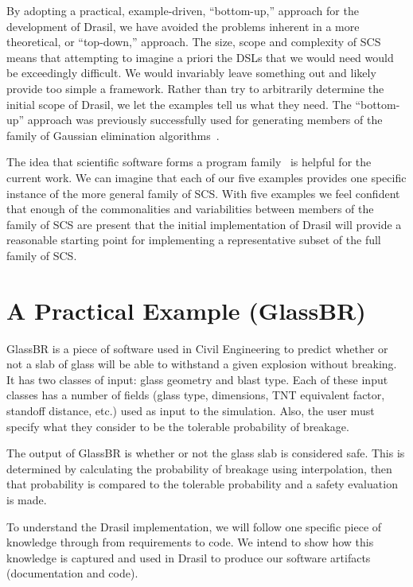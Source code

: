 \documentclass[sigconf]{acmart}
\begin{document}
By adopting a practical, example-driven, ``bottom-up,'' approach for the
development of Drasil, we have avoided the problems inherent in a more
theoretical, or ``top-down,'' approach.  The size, scope and complexity of SCS
means that attempting to imagine a priori the DSLs that we would need would be
exceedingly difficult.  We would invariably leave something out and likely
provide too simple a framework.  Rather than try to arbitrarily determine the
initial scope of Drasil, we let the examples tell us what they need. The
``bottom-up'' approach was previously successfully used for generating members
of the family of Gaussian elimination algorithms~\cite{Carette2006}.  

The idea that scientific software forms a program
family~\cite{SmithMcCutchanAndCao2007} is helpful for the current work.  We can
imagine that each of our five examples provides one specific instance of the
more general family of SCS.  With five examples we feel confident that enough of
the commonalities and variabilities between members of the family of SCS are
present that the initial implementation of Drasil will provide a reasonable
starting point for implementing a representative subset of the full family of
SCS.

\section{A Practical Example (GlassBR)} \label{SecGlassBR}

GlassBR is a piece of software used in Civil Engineering to predict whether or 
not a slab of glass will be able to withstand a given explosion without breaking. It
has two classes of input: glass geometry and blast type. Each of these input 
classes has a number of fields (glass type, dimensions, TNT equivalent factor, 
standoff distance, etc.) used as input to the simulation. Also, the user must 
specify what they consider to be the tolerable probability of breakage.

The output of GlassBR is whether or not the glass slab is considered safe. 
This is determined by calculating the probability of breakage using 
interpolation, then that probability is compared to the tolerable probability 
and a safety evaluation is made.

To understand the Drasil implementation, we will follow one specific piece of 
knowledge through from requirements to code. We intend to show how this 
knowledge is captured and used in Drasil to produce our software artifacts 
(documentation and code).
\end{document}
